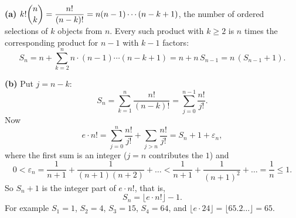 \textbf{(a)} $k!\dbinom{n}{k}=\dfrac{n!}{(n-k)!}=n(n-1)\cdots(n-k+1)$, the number of ordered selections of $k$ objects from $n$. Every such product with $k\ge2$ is $n$ times the corresponding product for $n-1$ with $k-1$ factors:
\[
S_n=n+\sum_{k=2}^{n}n\cdot(n-1)\cdots(n-k+1)=n+n\,S_{n-1}=n\,(S_{n-1}+1).
\]

\textbf{(b)} Put $j=n-k$:
\[
S_n=\sum_{k=1}^{n}\dfrac{n!}{(n-k)!}=\sum_{j=0}^{n-1}\dfrac{n!}{j!}.
\]
Now
\[
e\cdot n!=\sum_{j=0}^{n}\dfrac{n!}{j!}+\sum_{j>n}\dfrac{n!}{j!}=S_n+1+\varepsilon_n ,
\]
where the first sum is an integer ($j=n$ contributes the $1$) and
\[
0<\varepsilon_n=\dfrac{1}{n+1}+\dfrac{1}{(n+1)(n+2)}+\dots<\dfrac{1}{n+1}+\dfrac{1}{(n+1)^2}+\dots=\dfrac{1}{n}\le1 .
\]
So $S_n+1$ is the integer part of $e\cdot n!$, that is,
\[
\boxed{S_n=\lfloor e\cdot n!\rfloor-1}.
\]
For example $S_1=1$, $S_2=4$, $S_3=15$, $S_4=64$, and $\lfloor e\cdot24\rfloor=\lfloor65.2\ldots\rfloor=65$.
